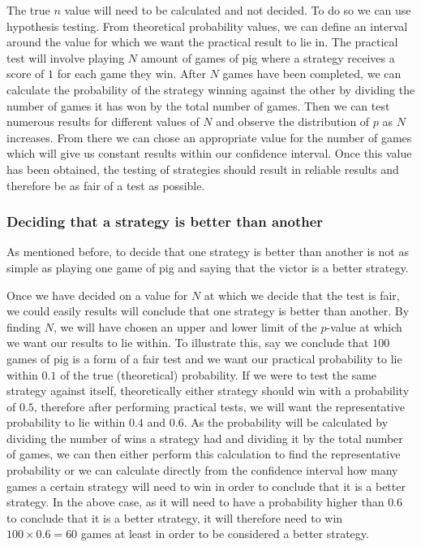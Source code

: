 \documentclass[a4paper,titlepage]{article}
\begin{document}
The true $n$ value will need to be calculated and not decided. To do so we can use hypothesis testing. From theoretical probability values, we can define an interval around the value for which we want the practical result to lie in. The practical test will involve playing $N$ amount of games of pig where a strategy receives a score of $1$ for each game they win. After $N$ games have been completed, we can calculate the probability of the strategy winning against the other by dividing the number of games it has won by the total number of games. Then we can test numerous results for different values of $N$ and observe the distribution of $p$ as $N$ increases. From there we can chose an appropriate value for the number of games which will give us constant results within our confidence interval. Once this value has been obtained, the testing of strategies should result in reliable results and therefore be as fair of a test as possible.
 \subsubsection{Deciding that a strategy is better than another}
As mentioned before, to decide that one strategy is better than another is not as simple as playing one game of pig and saying that the victor is a better strategy.

Once we have decided on a value for $N$ at which we decide that the test is fair, we could easily results will conclude that one strategy is better than another. By finding $N$, we will have chosen an upper and lower limit of the $p$-value at which we want our results to lie within. To illustrate this, say we conclude that $100$ games of pig is a form of a fair test and we want our practical probability to lie within $0.1$ of the true (theoretical) probability. If we were to test the same strategy against itself, theoretically either strategy should win with a probability of $0.5$, therefore after performing practical tests, we will want the representative probability to lie within $0.4$ and $0.6$. As the probability will be calculated by dividing the number of wins a strategy had and dividing it by the total number of games, we can then either perform this calculation to find the representative probability or we can calculate directly from the confidence interval how many games a certain strategy will need to win in order to conclude that it is a better strategy. In the above case, as it will need to have a probability higher than $0.6$ to conclude that it is a better strategy, it will therefore need to win $100\times0.6=60$ games at least in order to be considered a better strategy.
\end{document}
